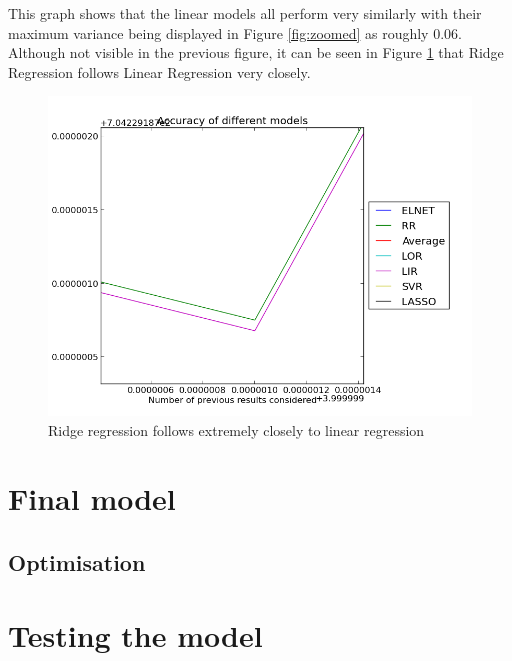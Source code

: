 This graph shows that the linear models all perform very similarly with their maximum variance being displayed in Figure \ref{fig:zoomed} as roughly 0.06. Although not visible in the previous figure, it can be seen in Figure \ref{fig:whereisrr} that Ridge Regression follows Linear Regression very closely.

\begin{figure}[p]
\centering
\includegraphics[width=1\textwidth]{whereisrr.png}
\caption{Ridge regression follows extremely closely to linear regression}
\label{fig:whereisrr}
\end{figure}


\section{Final model}

\subsection{Optimisation}

\section{Testing the model}
